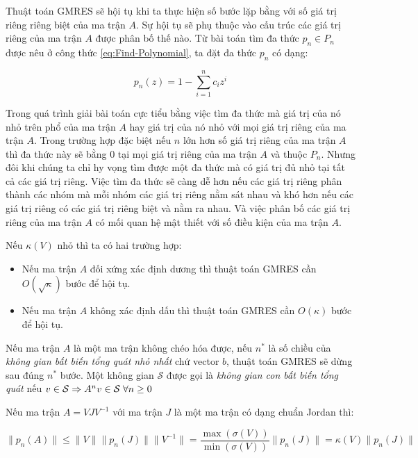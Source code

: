 \documentclass[14pt, a4paper]{article}
\numberwithin{equation}{section}
\numberwithin{algorithm}{section}
\numberwithin{figure}{section}
\numberwithin{dl}{section}
\numberwithin{md}{section}
\numberwithin{bd}{section}
\begin{document}
Thuật toán GMRES sẽ hội tụ khi ta thực hiện số bước lặp bằng với số giá trị riêng riêng biệt của ma trận $A$. Sự hội tụ sẽ phụ thuộc vào cấu trúc các giá trị riêng của ma trận $A$ được phân bố thế nào.
Từ bài toán tìm đa thức $p_n \in P_n$ được nêu ở công thức \ref{eq:Find-Polynomial}, ta đặt đa thức $p_n$ có dạng:

\begin{equation}
    p_n(z) = 1 - \sum_{i=1}^n c_i z^i
\end{equation}

Trong quá trình giải bài toán cực tiểu bằng việc tìm đa thức mà giá trị của nó nhỏ trên phổ của ma trận $A$ hay giá trị của nó nhỏ với mọi giá trị riêng của ma trận $A$. Trong trường hợp đặc biệt nếu $n$ lớn hơn số giá trị riêng của ma trận $A$ thì đa thức này sẽ bằng 0 tại mọi giá trị riêng của ma trận $A$ và thuộc $P_n$.
Nhưng đôi khi chúng ta chỉ hy vọng tìm được một đa thức mà có giá trị đủ nhỏ tại tất cả các giá trị riêng. Việc tìm đa thức sẽ càng dễ hơn nếu các giá trị riêng phân thành các nhóm mà mỗi nhóm các giá trị riêng nằm sát nhau và khó hơn nếu các giá trị riêng có các giá trị riêng biệt và nằm ra nhau. Và việc phân bố các giá trị riêng của ma trận $A$ có mối quan hệ mật thiết với số điều kiện của ma trận $A$.

Nếu $\kappa(V)$ nhỏ thì ta có hai trường hợp:
\begin{itemize}
    \item Nếu ma trận $A$ đối xứng xác định dương thì thuật toán GMRES cần $O(\sqrt{\kappa})$ bước để hội tụ.
    \item Nếu ma trận $A$ không xác định dấu thì thuật toán GMRES cần $O(\kappa)$ bước để hội tụ.
\end{itemize}

Nếu ma trận $A$ là một ma trận không chéo hóa được, nếu $n^{*}$ là số chiều của \textit{không gian bất biến tổng quát nhỏ nhất} chứ vector $b$, thuật toán GMRES sẽ dừng sau đúng $n^{*}$ bước. Một không gian $\mathcal{S}$ được gọi là \textit{không gian con bất biến tổng quát} nếu $v \in \mathcal{S} \Rightarrow A^{n}v \in \mathcal{S} \thickspace \forall n \geq 0$ 

Nếu ma trận $A=VJV^{-1}$ với ma trận $J$ là một ma trận có dạng chuẩn Jordan thì:

\begin{equation}
    \lVert p_n(A) \rVert \leq \lVert V \rVert \lVert p_n(J) \rVert \lVert V^{-1} \rVert=\dfrac{\max(\sigma(V))}{\min(\sigma(V))} \lVert p_n(J) \rVert = \kappa(V) \lVert p_n(J) \rVert
\end{equation}
\end{document}
